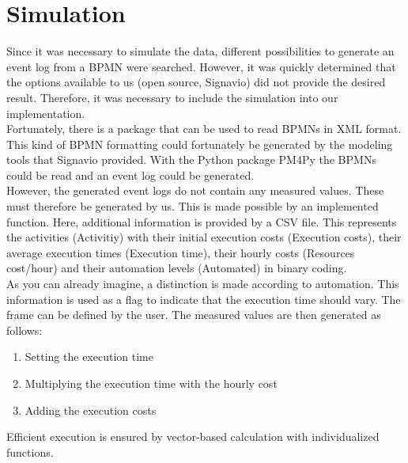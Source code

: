     \section{Simulation}
    Since it was necessary to simulate the data, different possibilities to generate an event log from a BPMN were searched. However, it was quickly determined that the options available to us (open source, Signavio) did not provide the desired result. Therefore, it was necessary to include the simulation into our implementation.\\
    Fortunately, there is a package that can be used to read BPMNs in XML format. This kind of BPMN formatting could fortunately be generated by the modeling tools that Signavio provided. With the Python package PM4Py the BPMNs could be read and an event log could be generated.\\
    However, the generated event logs do not contain any measured values. These must therefore be generated by us. This is made possible by an implemented function. Here, additional information is provided by a CSV file. This represents the activities (Activitiy) with their initial execution costs (Execution costs), their average execution times (Execution time), their hourly costs (Resources cost/hour) and their automation levels (Automated) in binary coding.\\
    As you can already imagine, a distinction is made according to automation. This information is used as a flag to indicate that the execution time should vary. The frame can be defined by the user. The measured values are then generated as follows:
    \begin{enumerate}
        \item Setting the execution time
        \item Multiplying the execution time with the hourly cost
        \item Adding the execution costs
    \end{enumerate}
    Efficient execution is ensured by vector-based calculation with individualized functions.


